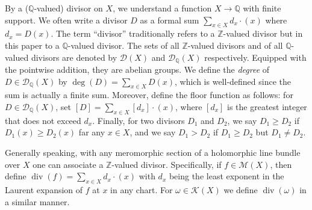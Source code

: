 \documentclass[12pt]{amsart}
\numberwithin{equation}{section}
\theoremstyle{plain}
\theoremstyle{definition}
\theoremstyle{remark}
\renewcommand\div{\mathop{\mathrm{div}}}
\newcommand\numZ{\mathbb{Z}}
\newcommand\numQ{\mathbb{Q}}
\begin{document}
By a ($\numQ$-valued) divisor on $X$, we understand a function $X\rightarrow\numQ$ with finite support. We often write a divisor $D$ as a formal sum $\sum_{x\in X}d_x\cdot(x)$ where $d_x=D(x)$. The term ``divisor'' traditionally refers to a $\numZ$-valued divisor but in this paper to a $\numQ$-valued divisor. The sets of all $\numZ$-valued divisors and of all $\numQ$-valued divisors are denoted by $\mathscr{D}(X)$ and $\mathscr{D}_\numQ(X)$ respectively. Equipped with the pointwise addition, they are abelian groups. We define the \emph{degree} of $D\in\mathscr{D}_\numQ(X)$ by $\deg(D)=\sum_{x\in X}D(x)$, which is well-defined since the sum is actually a finite sum. Moreover, define the floor function as follows: for $D\in\mathscr{D}_\numQ(X)$, set $[D]=\sum_{x\in X}[d_x]\cdot(x)$, where $[d_x]$ is the greatest integer that does not exceed $d_x$. Finally, for two divisors $D_1$ and $D_2$, we say $D_1\geq D_2$ if $D_1(x) \geq D_2(x)$ far any $x\in X$, and we say $D_1 > D_2$ if $D_1 \geq D_2$ but $D_1\neq D_2$.

Generally speaking, with any meromorphic section of a holomorphic line bundle over $X$ one can associate a $\numZ$-valued divisor. Specifically, if $f\in\mathscr{M}(X)$, then define $\div(f)=\sum_{x\in X}d_x\cdot(x)$ with $d_x$ being the least exponent in the Laurent expansion of $f$ at $x$ in any chart. For $\omega\in\mathscr{K}(X)$ we define $\div(\omega)$ in a similar manner.
\end{document}
